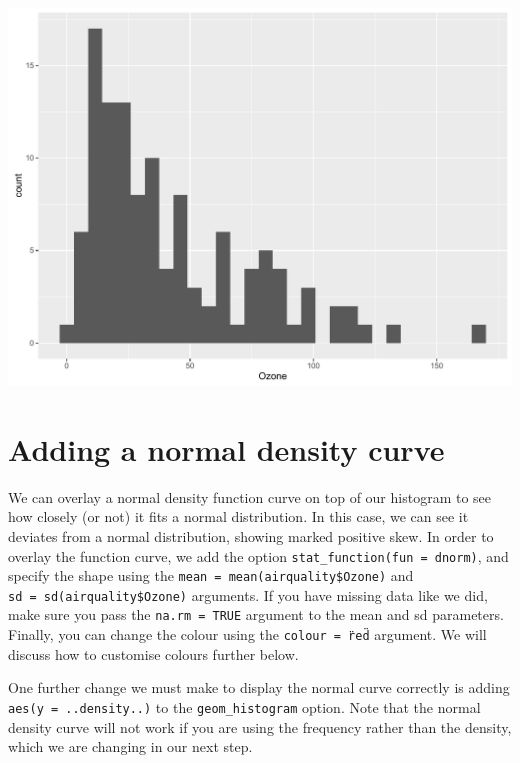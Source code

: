 \begin{center}\includegraphics[width=0.55\linewidth]{figures/histogram_1-1} \end{center}

\section{Adding a normal density
curve}\label{adding-a-normal-density-curve}

We can overlay a normal density function curve on top of our histogram
to see how closely (or not) it fits a normal distribution. In this case,
we can see it deviates from a normal distribution, showing marked
positive skew. In order to overlay the function curve, we add the option
\texttt{stat\_function(fun\ =\ dnorm)}, and specify the shape using the
\texttt{mean\ =\ mean(airquality\$Ozone)} and
\texttt{sd\ =\ sd(airquality\$Ozone)} arguments. If you have missing
data like we did, make sure you pass the \texttt{na.rm\ =\ TRUE}
argument to the mean and sd parameters. Finally, you can change the
colour using the \texttt{colour\ =\ \"red\"} argument. We will discuss how
to customise colours further below.

One further change we must make to display the normal curve correctly is
adding \texttt{aes(y\ =\ ..density..)} to the \texttt{geom\_histogram}
option. Note that the normal density curve will not work if you are
using the frequency rather than the density, which we are changing in
our next step.

\begin{Shaded}
\begin{Highlighting}[]
\StringTok{ }\NormalTok{(} \StringTok{ }
\StringTok{      }\NormalTok{(}\NormalTok{(} 
\StringTok{      }\NormalTok{(}  \NormalTok{, }
\StringTok{        } \NormalTok{(}  \NormalTok{), }
\StringTok{        }  \NormalTok{)))}
\end{Highlighting}
\end{Shaded}

